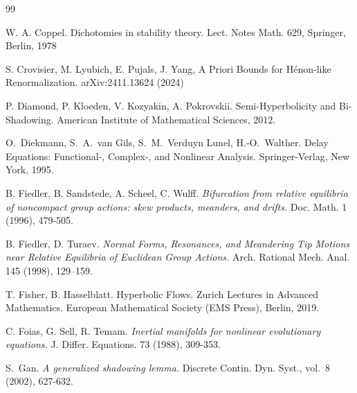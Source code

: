 \documentclass[12pt]{article}
\theoremstyle{definition}
\begin{document}
\begin{thebibliography}{99}
{ W. A. Coppel. Dichotomies in stability theory. Lect. Notes Math. 629, Springer, Berlin, 1978

S. Crovisier, M. Lyubich, E. Pujals, J. Yang, A Priori Bounds for Hénon-like Renormalization. arXiv:2411.13624 (2024)

P. Diamond, P. Kloeden, V. Kozyakin, A. Pokrovskii. Semi-Hyperbolicity and Bi-Shadowing. American Institute of Mathematical Sciences, 2012.

O.~Diekmann, S.~A.\ van Gils, S.~M.\ Verduyn Lunel, H.-O.\ Walther.
\newblock Delay Equations: Functional-, Complex-, and Nonlinear Analysis.
\newblock Springer-Verlag, New York, 1995.



B. Fiedler, B. Sandstede, A. Scheel, C. Wulff. \textit{Bifurcation from relative equilibria of noncompact group actions: skew products, meanders, and drifts.} Doc. Math. 1 (1996), 479-505.

B. Fiedler, D. Turaev. \textit{Normal Forms, Resonances, and Meandering Tip Motions near Relative Equilibria of Euclidean Group Actions.} Arch. Rational Mech. Anal. 145 (1998), 129–159. %

T. Fisher, B. Hasselblatt. Hyperbolic Flows.
Zurich Lectures in Advanced Mathematics. European Mathematical Society (EMS Press), Berlin, 2019. 

C. Foias, G. Sell, R. Temam. \textit{Inertial manifolds for nonlinear evolutionary equations.} J. Differ. Equations. 73 (1988), 309-353.


S.~Gan. \textit{A generalized shadowing lemma.} Discrete Contin. Dyn. Syst., vol.~8 (2002), 627-632.

}
\end{thebibliography}
\end{document}
